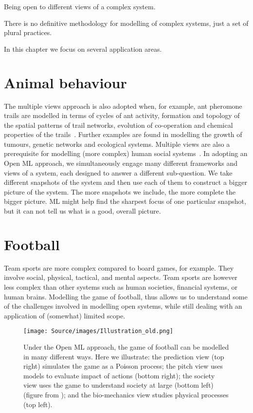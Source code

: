 
Being open to different views of a complex system.


There is no definitive methodology for modelling of complex systems, just a set of plural practices. 

In this chapter we 
focus on several application areas.



\section{Animal behaviour}

The multiple views approach is also adopted when, for example, ant pheromone trails are modelled in terms of cycles of ant activity, formation and topology of the spatial patterns of trail networks, evolution of co-operation and chemical properties of the trails~\cite{sumpter2010collective}. Further examples are found in modelling the growth of tumours, genetic networks and ecological systems. Multiple views are also a prerequisite for modelling (more complex) human social systems~\cite{helbing2010pluralistic}. In adopting an Open ML approach, we simultaneously engage many different frameworks and views of a system, each designed to answer a different sub-question. We take different snapshots of the system and then use each of them to construct a bigger picture of the system. The more snapshots we include, the more complete the bigger picture. ML might help find the sharpest focus of one particular snapshot, but it can not tell us what is a good, overall picture.



\section{Football}

Team sports are more complex compared to board 
games, for example. They involve social, physical, tactical, and mental aspects. Team sports are however less complex than other 
systems such as human societies, 
financial systems, or human brains. 
Modelling the game of football, 
thus allows us to understand some of the challenges involved in modelling open systems, while still dealing with an application of (somewhat) limited scope.

\begin{figure}[t]
\texttt{[image: Source/images/Illustration\_old.png]}
\centering
\caption{Under the Open ML approach, the game of football can be modelled in many different ways. Here we illustrate: the prediction view (top right) simulates the game as a Poisson process; the pitch view uses models to evaluate impact of actions (bottom right); the society view uses the game to understand society at large (bottom left) (figure from \cite{Gregory2021Pace}); and the bio-mechanics view studies physical processes (top left). \label{football}} 

\end{figure}

